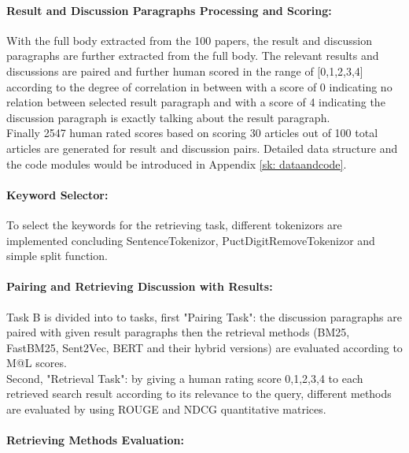 \paragraph{Result and Discussion Paragraphs Processing and Scoring:}

With the full body extracted from the 100 papers, the result and discussion paragraphs are further extracted from the full body.
The relevant results and discussions are paired and further human scored in the range of [0,1,2,3,4] according to the degree of correlation in between with a score of 0 indicating no relation between selected result paragraph and with a score of 4 indicating the discussion paragraph is exactly talking about the result paragraph.	\\

Finally 2547 human rated scores based on scoring 30 articles out of 100 total articles are generated for result and discussion pairs.
Detailed data structure and the code modules would be introduced in Appendix \ref{sk: dataandcode}.

\paragraph{Keyword Selector:}

To select the keywords for the retrieving task, different tokenizors are implemented concluding SentenceTokenizor, PuctDigitRemoveTokenizor and simple split function.

\paragraph{Pairing and Retrieving Discussion with Results:}

Task B is divided into to tasks, first "Pairing Task": the discussion paragraphs are paired with given result paragraphs then the retrieval methods (BM25, FastBM25, Sent2Vec, BERT and their hybrid versions) are evaluated according to M@L scores.\\

Second, "Retrieval Task": by giving a human rating score {0,1,2,3,4} to each retrieved search result according to its relevance to the query, different methods are evaluated by using ROUGE and NDCG quantitative matrices.

\paragraph{Retrieving Methods Evaluation:}

